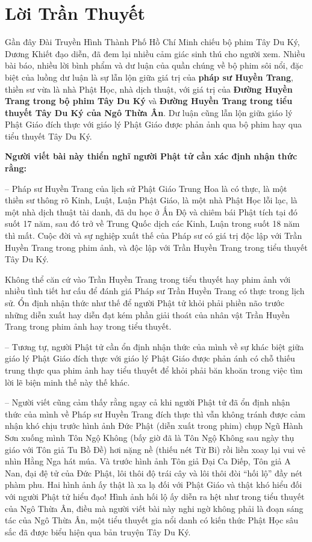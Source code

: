 \chapter{Lời Trần Thuyết} %
\label{cha:loi_tran_thuyet}

Gần đây Đài Truyền Hình Thành Phố Hồ Chí Minh chiếu bộ phim Tây Du Ký, Dương Khiết đạo diễn, đã đem lại nhiều cảm giác sinh thú cho người xem. Nhiều bài báo, nhiều lời bình phẩm và dư luận của quần chúng về bộ phim sôi nổi, đặc biệt của luồng dư luận là sự lẫn lộn giữa giá trị của {\bf pháp sư Huyền Trang}, thiền sư vừa là nhà Phật Học, nhà dịch thuật, với giá trị của {\bf Đường Huyền Trang trong bộ phim Tây Du Ký} và {\bf Đường Huyền Trang trong tiểu thuyết Tây Du Ký của Ngô Thừa Ân}. Dư luận cũng lẫn lộn giữa giáo lý Phật Giáo đích thực với giáo lý Phật Giáo được phản ảnh qua bộ phim hay qua tiểu thuyết Tây Du Ký.

{\bf Người viết bài này thiển nghĩ người Phật tử cần xác định nhận thức rằng:}

-- Pháp sư Huyền Trang của lịch sử Phật Giáo Trung Hoa là có thực, là một thiền sư thông rõ Kinh, Luật, Luận Phật Giáo, là một nhà Phật Học lỗi lạc, là một nhà dịch thuật tài danh, đã du học ở Ấn Độ và chiêm bái Phật tích tại đó suốt 17 năm, sau đó trở về Trung Quốc dịch các Kinh, Luận trong suốt 18 năm thì mất. Cuộc đời và sự nghiệp xuất thế của Pháp sư có giá trị độc lập với Trần Huyền Trang trong phim ảnh, và độc lập với Trần Huyền Trang trong tiểu thuyết Tây Du Ký.

Không thể căn cứ vào Trần Huyền Trang trong tiểu thuyết hay phim ảnh với nhiều tình tiết hư cấu để đánh giá Pháp sư Trần Huyền Trang có thực trong lịch sử. Ổn định nhận thức như thế để người Phật tử khỏi phải phiền não trước những diễn xuất hay diễn đạt kém phần giải thoát của nhân vật Trần Huyền Trang trong phim ảnh hay trong tiểu thuyết.

-- Tương tự, người Phật tử cần ổn định nhận thức của mình về sự khác biệt giữa giáo lý Phật Giáo đích thực với giáo lý Phật Giáo được phản ánh có chỗ thiếu trung thực qua phim ảnh hay tiểu thuyết để khỏi phải băn khoăn trong việc tìm lời lẽ biện minh thế này thế khác.

-- Người viết cũng cảm thấy rằng ngay cả khi người Phật tử đã ổn định nhận thức của mình về Pháp sư Huyền Trang đích thực thì vẫn không tránh được cảm nhận khó chịu trước hình ảnh Đức Phật (diễn xuất trong phim) chụp Ngũ Hành Sơn xuống mình Tôn Ngộ Không (bấy giờ đã là Tôn Ngộ Không sau ngày thụ giáo với Tôn giả Tu Bồ Đề) hơi nặng nề (thiếu nét Từ Bi) rồi liền xoay lại vui vẻ nhìn Hằng Nga hát múa. Và trước hình ảnh Tôn giả Đại Ca Diếp, Tôn giả A Nan, đại đệ tử của Đức Phật, lôi thôi độ trái cây và lôi thôi đòi ``hối lộ'' đầy nét phàm phu. Hai hình ảnh ấy thật là xa lạ đối với Phật Giáo và thật khó hiểu đối với người Phật tử hiểu đạo! Hình ảnh hối lộ ấy diễn ra hệt như trong tiểu thuyết của Ngô Thừa Ân, điều mà người viết bài này nghi ngờ không phải là đoạn sáng tác của Ngô Thừa Ân, một tiểu thuyết gia nổi danh có kiến thức Phật Học sâu sắc đã được biểu hiện qua bản truyện Tây Du Ký.

